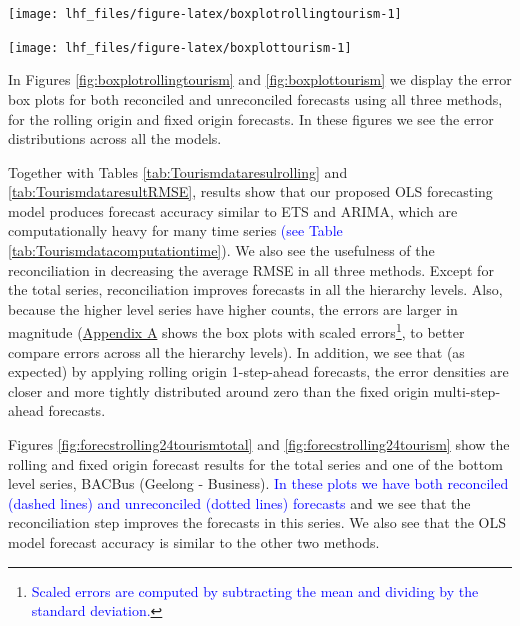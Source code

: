 \documentclass[11pt,a4paper,]{article}
\let\origfigure\figure
\let\endorigfigure\endfigure
\renewenvironment{figure}[1][2] {
    \expandafter\origfigure\expandafter[!htbp]
} {
    \endorigfigure
}
\begin{document}
\begin{figure}

{\centering \texttt{[image: lhf\_files/figure-latex/boxplotrollingtourism-1]} 

}

\caption{Box plots of rolling origin forecast errors from reconciled and unreconciled ETS, ARIMA and OLS methods at each hierarchical level for tourism demand.}\label{fig:boxplotrollingtourism}
\end{figure}

\begin{figure}

{\centering \texttt{[image: lhf\_files/figure-latex/boxplottourism-1]} 

}

\caption{Box plots of fixed origin forecast errors for reconciled and unreconciled ETS, ARIMA and OLS methods at each hierarchical level for tourism demand.}\label{fig:boxplottourism}
\end{figure}

In Figures \ref{fig:boxplotrollingtourism} and \ref{fig:boxplottourism} we display the error box plots for both reconciled and unreconciled forecasts using all three methods, for the rolling origin and fixed origin forecasts. In these figures we see the error distributions across all the models.

Together with Tables \ref{tab:Tourismdataresulrolling} and \ref{tab:TourismdataresultRMSE}, results show that our proposed OLS forecasting model produces forecast accuracy similar to ETS and ARIMA, which are computationally heavy for many time series \textcolor{blue}{(see Table} \ref{tab:Tourismdatacomputationtime}). We also see the usefulness of the reconciliation in decreasing the average RMSE in all three methods. Except for the total series, reconciliation improves forecasts in all the hierarchy levels. Also, because the higher level series have higher counts, the errors are larger in magnitude (\protect\hyperlink{appendixA}{Appendix A} shows the box plots with scaled errors\footnote{\textcolor{blue}{Scaled errors are computed by subtracting the mean and dividing by the standard deviation.}}, to better compare errors across all the hierarchy levels). In addition, we see that (as expected) by applying rolling origin 1-step-ahead forecasts, the error densities are closer and more tightly distributed around zero than the fixed origin multi-step-ahead forecasts.

Figures \ref{fig:forecstrolling24tourismtotal} and \ref{fig:forecstrolling24tourism} show the rolling and fixed origin forecast results for the total series and one of the bottom level series, BACBus (Geelong - Business). \textcolor{blue} {In these plots we have both reconciled (dashed lines) and unreconciled (dotted lines) forecasts} and we see that the reconciliation step improves the forecasts in this series. We also see that the OLS model forecast accuracy is similar to the other two methods.
\end{document}
